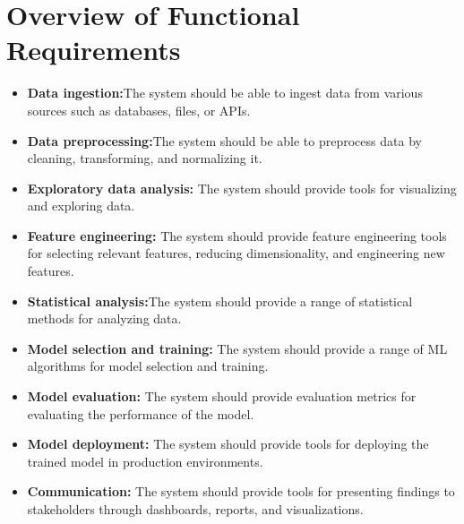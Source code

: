 \section{Overview of Functional Requirements}
\justify
\quad
\begin{itemize}
    \item \textbf{Data ingestion:}The system should be able to ingest data from various sources such as databases, files, or APIs.
    \item \textbf{Data preprocessing:}The system should be able to preprocess data by cleaning, transforming, and normalizing it.
    \item \textbf{Exploratory data analysis: }The system should provide tools for visualizing and exploring data.
    \item \textbf{Feature engineering: }The system should provide feature engineering tools for selecting relevant features, reducing dimensionality, and engineering new features.
    \item \textbf{Statistical analysis:}The system should provide a range of statistical methods for analyzing data.
    \item \textbf{Model selection and training: }The system should provide a range of ML algorithms for model selection and training.
    \item \textbf{Model evaluation:  }The system should provide evaluation metrics for evaluating the performance of the model.
    \item \textbf{Model deployment:} The system should provide tools for deploying the trained model in production environments.
    \item \textbf{Communication: } The system should provide tools for presenting findings to stakeholders through dashboards, reports, and visualizations.


\end{itemize}

\newpage